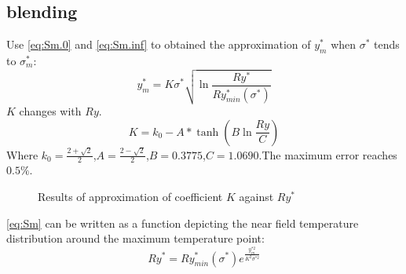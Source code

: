 \documentclass[review, 1p, number, sort&compress,table]{elsarticle}
\begin{document}
	\subsection{blending}
	Use \autoref{eq:Sm.0} and \autoref{eq:Sm.inf} to obtained the approximation of $y^{*}_m$ when $\sigma^{*}$ tends to $\sigma^{*}_m$:
	\begin{equation} \label{eq:Sm}
		y_m^{*}=K\sigma^{*}\sqrt{\ln{\frac{Ry^{*}}{Ry_{min}^{*}(\sigma^{*})}}}
	\end{equation}
	$K$ changes with $Ry$.
	\begin{equation} \label{K@Sm}
		K=k_0-A*\tanh{\left(B\ln{\frac{Ry}{C}}\right)}
	\end{equation}
	Where $k_0=\frac{2+\sqrt{2}}{2}$,$A=\frac{2-\sqrt{2}}{2}$,$B=0.3775$,$C=1.0690$.The maximum error reaches $0.5\%$.
				\begin{figure*}[ht!]
					\begin{center}
					\end{center}
					\caption{Results of approximation of coefficient $K$ against $Ry^{*}$  }
					\label{fig:A.KvR}
				\end{figure*}
	\autoref{eq:Sm} can be written as a function depicting the near field temperature distribution around the maximum temperature point:
	\begin{equation} \label{eq:near field}
		Ry^{*}=Ry_{min}^{*}\left(\sigma^{*}\right)e^{\frac{y_m^{*2}}{K^2\sigma^{*2}}}
	\end{equation}
\end{document}
